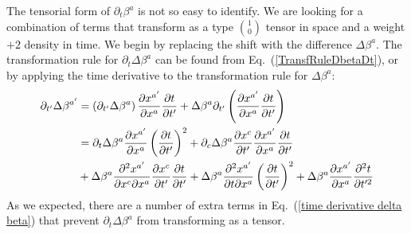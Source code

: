 \documentclass[letterpaper,nofootinbib,prd,amsmath,onecolumn]{revtex4-1}
\begin{document}
The tensorial form of $\partial_t \beta^a$ is not so easy to identify. We are looking for a combination of terms that 
transform as a type $1\choose 0$ tensor in space and a weight $+2$ density in time. 
We begin by replacing the shift with the difference $\Delta\beta^a$. 
The transformation rule for $\partial_t \Delta\beta^a$ can be found from Eq.~(\ref{TransfRuleDbetaDt}), or by applying the time 
derivative to the transformation rule for $\Delta\beta^a$:
\begin{align}\label{time derivative delta beta} 
\partial_{t'}\Delta \beta^{a'} & = \left(\partial_{t'}\Delta \beta^{a}\right)\frac{\partial x^{a'}}{\partial x^{a}}\frac{\partial t}{\partial t'} 
+ \Delta \beta^{a}\partial_{t'}\left(\frac{\partial x^{a'}}{\partial x^{a}}\frac{\partial t}{\partial t'}\right)\notag\\
& = \partial_{t}\Delta \beta^{a}\frac{\partial x^{a'}}{\partial x^{a}}\left(\frac{\partial t}{\partial t'}\right)^{2} 
+ \partial_{c}\Delta \beta^{a}\frac{\partial x^{c}}{\partial t'}\frac{\partial x^{a'}}{\partial x^{a}}\frac{\partial t}{\partial t'}\notag\\
& + \Delta \beta^{a}\frac{\partial^{2} x^{a'}}{\partial x^{c}\partial x^{a}}\frac{\partial x^{c}}{\partial t'}\frac{\partial t}{\partial t'} 
+ \Delta \beta^{a}\frac{\partial^{2}x^{a'}}{\partial t\partial x^{a}}\left(\frac{\partial t}{\partial t'}\right)^{2}
+ \Delta \beta^{a}\frac{\partial x^{a'}}{\partial x^{a}}\frac{\partial^{2}t}{\partial t'^{2}} 
\end{align}
As we expected, there are a number of extra terms in Eq.~(\ref{time derivative delta beta}) that prevent $\partial_{t}\Delta\beta^{a}$ from 
transforming as a tensor. 
\end{document}
